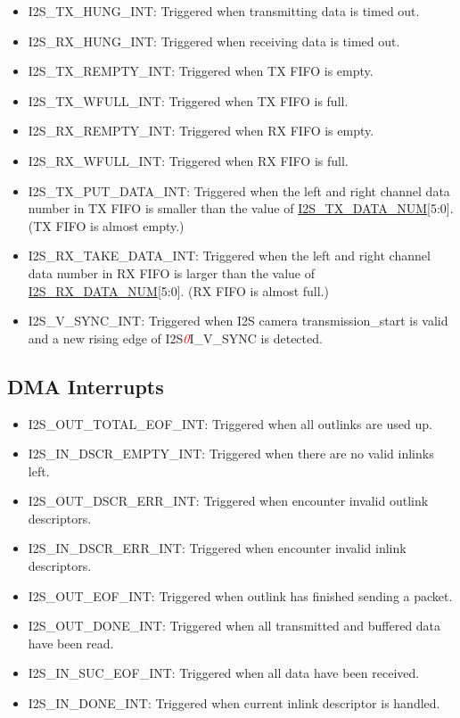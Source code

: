 \documentclass[main\_\_EN.tex]{subfiles}
\begin{document}
\begin{itemize}
\item \label{int:I2STXHUNGINT}I2S\_TX\_HUNG\_INT: Triggered when transmitting data is timed out.
\item \label{int:I2SRXHUNGINT}I2S\_RX\_HUNG\_INT: Triggered when receiving data is timed out.
\item \label{int:I2STXREMPTYINT}I2S\_TX\_REMPTY\_INT: Triggered when TX FIFO is empty.
\item \label{int:I2STXWFULLINT}I2S\_TX\_WFULL\_INT: Triggered when TX FIFO is full.
\item \label{int:I2SRXREMPTYINT}I2S\_RX\_REMPTY\_INT: Triggered when RX FIFO is empty.
\item \label{int:I2SRXWFULLINT}I2S\_RX\_WFULL\_INT: Triggered when RX FIFO is full.
\item \label{int:I2STXPUTDATAINT}I2S\_TX\_PUT\_DATA\_INT: Triggered when the left and right channel data number in TX FIFO is smaller than the value of \hyperref[fielddesc:I2STXDATANUM]{I2S\_TX\_DATA\_NUM}[5:0]. (TX FIFO is almost empty.)
\item \label{int:I2SRXTAKEDATAINT}I2S\_RX\_TAKE\_DATA\_INT: Triggered when the left and right channel data number in RX FIFO is larger than the value of \hyperref[fielddesc:I2SRXDATANUM]{I2S\_RX\_DATA\_NUM}[5:0]. (RX FIFO is almost full.)

\item \label{int:I2SVSYNCINT}I2S\_V\_SYNC\_INT: Triggered when I2S camera transmission\_start is valid and a new rising edge of I2S\textcolor{red}{\it{0}}I\_V\_SYNC is detected.
\end{itemize}

\subsection{DMA Interrupts}\label{section:DMA interrupts}
\begin{itemize}
\item \label{int:I2SOUTTOTALEOFINT}I2S\_OUT\_TOTAL\_EOF\_INT: Triggered when all outlinks are used up.
\item \label{int:I2SINDSCREMPTYINT}I2S\_IN\_DSCR\_EMPTY\_INT: Triggered when there are no valid inlinks left.
\item \label{int:I2SOUTDSCRERRINT}I2S\_OUT\_DSCR\_ERR\_INT: Triggered when encounter invalid outlink descriptors.
\item \label{int:I2SINDSCRERRINT}I2S\_IN\_DSCR\_ERR\_INT: Triggered when encounter invalid inlink descriptors.
\item \label{int:I2SOUTEOFINT}I2S\_OUT\_EOF\_INT: Triggered when outlink has finished sending a packet.
\item \label{int:I2SOUTDONEINT}I2S\_OUT\_DONE\_INT: Triggered when all transmitted and buffered data have been read.
\item \label{int:I2SINSUCEOFINT}I2S\_IN\_SUC\_EOF\_INT: Triggered when all data have been received.
\item \label{int:I2SINDONEINT}I2S\_IN\_DONE\_INT: Triggered when current inlink descriptor is handled.
\end{itemize}
\end{document}
